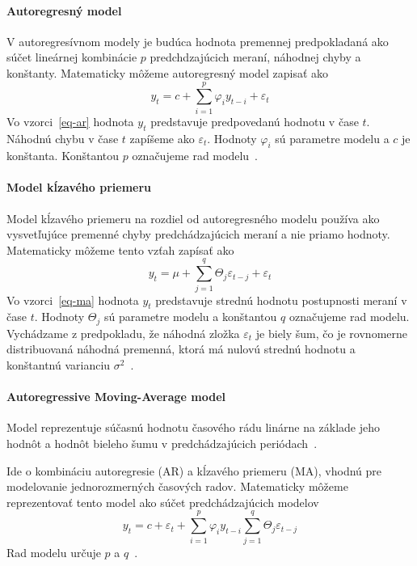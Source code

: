 \documentclass[a4paper,slovak,12pt,appendix]{article}
\begin{document}
\paragraph{Autoregresný model}
V autoregresívnom modely je budúca hodnota premennej predpokladaná ako súčet
lineárnej kombinácie $p$ predchdzajúcich meraní, náhodnej chyby a konštanty.
Matematicky môžeme autoregresný model zapisať ako
\begin{equation}
  y_t = c + \sum_{i=1}^{p} \varphi_i y_{t-i} + \varepsilon_t
  \label{eq-ar}
\end{equation}
Vo vzorci~\ref{eq-ar} hodnota $y_t$ predstavuje predpovedanú hodnotu
v čase $t$. Náhodnú chybu v čase $t$ zapíšeme ako $\varepsilon_t$. Hodnoty
$\varphi_i$ sú parametre modelu a $c$ je konštanta. Konštantou $p$ označujeme
rad modelu~\cite{Agrawal2013}.

\paragraph{Model kĺzavého priemeru}
Model kĺzavého priemeru na rozdiel od autoregresného modelu používa ako
vysvetľujúce premenné chyby predchádzajúcich meraní a nie priamo hodnoty.
Matematicky môžeme tento vzťah zapísať ako
\begin{equation}
  y_t = \mu + \sum_{j=1}^{q} \Theta_j \varepsilon_{t-j} + \varepsilon_t
  \label{eq-ma}
\end{equation}
Vo vzorci~\ref{eq-ma} hodnota $y_t$ predstavuje strednú hodnotu
postupnosti meraní v čase $t$. Hodnoty $\Theta_j$ sú parametre modelu
a konštantou $q$ označujeme rad modelu. Vychádzame z predpokladu, že náhodná
zložka $\varepsilon_t$ je biely šum, čo je rovnomerne distribuovaná náhodná
premenná, ktorá má nulovú strednú hodnotu a konštantnú varianciu
$\sigma^2$~\cite{Agrawal2013}.

\paragraph{Autoregressive Moving-Average model}
Model reprezentuje súčasnú hodnotu časového rádu linárne na základe jeho hodnôt
a hodnôt bieleho šumu v predchádzajúcich periódach~\cite{KumarSingh2013}.

Ide o kombináciu autoregresie (AR) a kĺzavého priemeru (MA), vhodnú pre
modelovanie jednorozmerných časových radov. Matematicky môžeme reprezentovať
tento model ako súčet predchádzajúcich modelov
\begin{equation}
  y_t = c + \varepsilon_t + \sum_{i=1}^{p} \varphi_i y_{t-i}  \sum_{j=1}^{q} \Theta_j \varepsilon_{t-j}
  \label{eq-arma}
\end{equation}
Rad modelu určuje $p$ a $q$~\cite{Agrawal2013}.
\end{document}
